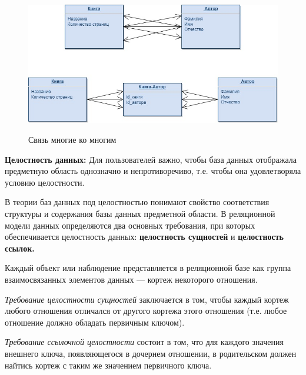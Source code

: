 \begin{figure}[!h]
    \centering
    \includegraphics[scale = 0.5]{nkn.jpg}
    \label{fig:nkn}
    \caption{Связь многие ко многим}
\end{figure}


\textbf{Целостность данных:} 
Для пользователей важно, чтобы база данных отображала предметную область однозначно и непротиворечиво, т.е. чтобы она удовлетворяла условию целостности.

В теории баз данных под целостностью понимают свойство соответствия структуры и содержания базы данных предметной области. В реляционной модели данных определяются два основных требования, при которых обеспечивается целостность данных: \textbf{целостность сущностей} и \textbf{целостность ссылок.}

Каждый объект или наблюдение представляется в реляционной базе как группа взаимосвязанных элементов данных — кортеж некоторого отношения.

\textit{Требование целостности сущностей} заключается в том, чтобы каждый кортеж любого отношения отличался от другого кортежа этого отношения (т.е. любое отношение должно обладать первичным ключом).

\textit{Требование ссылочной целостности} состоит в том, что для каждого значения внешнего ключа, появляющегося в дочернем отношении, в родительском должен найтись кортеж с таким же значением первичного ключа.
